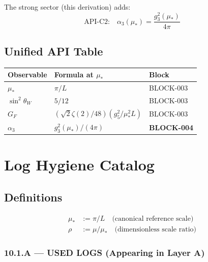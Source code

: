 \documentclass[11pt,a4paper]{article}
\theoremstyle{definition}
\begin{document}
The strong sector (this derivation) adds:
\begin{equation}
  \label{eq:strong-apis}
  \text{API-C2:} \quad \alpha_3(\mu_*) = \frac{g_3^2(\mu_*)}{4\pi}
\end{equation}

\subsection{Unified API Table}
\label{subsec:unified-api}

\begin{canonbox}
\begin{center}
\begin{tabular}{lll}
\toprule
\textbf{Observable} & \textbf{Formula at $\mu_*$} & \textbf{Block} \\
\midrule
$\mu_*$ & $\pi/L$ & BLOCK-003 \\
$\sin^2\theta_W$ & $5/12$ & BLOCK-003 \\
$G_F$ & $(\sqrt{2}\zeta(2)/48)(g_5^2/\mu_*^2 L)$ & BLOCK-003 \\
$\alpha_3$ & $g_3^2(\mu_*)/(4\pi)$ & \textbf{BLOCK-004} \\
\bottomrule
\end{tabular}
\end{center}
\end{canonbox}

\newpage

\section{Log Hygiene Catalog}
\label{sec:log-hygiene}

\subsection{Definitions}
\label{subsec:log-definitions}

\begin{align}
  \label{eq:log-defs}
  \mu_* &:= \pi/L \quad \text{(canonical reference scale)} \\
  \rho &:= \mu/\mu_* \quad \text{(dimensionless scale ratio)}
\end{align}

\subsubsection{10.1.A --- USED LOGS (Appearing in Layer A)}
\label{subsubsec:used-logs}
\end{document}
